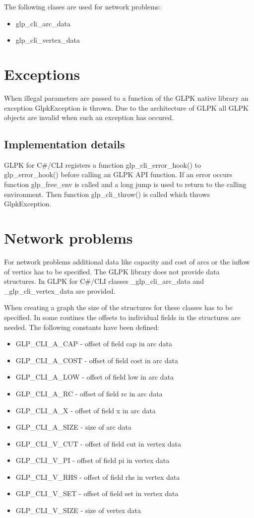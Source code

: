 \documentclass[a4paper,11pt]{report}
\begin{document}
The following clases are used for network problems:
\begin{itemize}
\item glp\_cli\_arc\_data
\item glp\_cli\_vertex\_data
\end{itemize}

\section{Exceptions}
When illegal parameters are passed to a function of the GLPK native library
an exception GlpkException is thrown. Due to the architecture of GLPK all
GLPK objects are invalid when such an exception has occured.

\subsection{Implementation details}
GLPK for C\#/CLI registers a function glp\_cli\_error\_hook() to glp\_error\_hook()
before calling an GLPK API function. If an error occurs function glp\_free\_env
is called and a long jump is used to return to the calling environment. Then
function glp\_cli\_throw() is called which throws GlpkException.

\section{Network problems}
For network problems additional data like capacity and cost of arcs or the
inflow of vertics has to be specified. The GLPK library does not provide
data structures. In GLPK for C\#/CLI classes \_glp\_cli\_arc\_data and
\_glp\_cli\_vertex\_data are provided.

When creating a graph the size of the structures for these classes has to be
specified. In some routines the offsets to individual fields in the structures are
needed. The following constants have been defined:

\begin{itemize}
\item GLP\_CLI\_A\_CAP  - offset of field cap in arc data
\item GLP\_CLI\_A\_COST - offset of field cost in arc data
\item GLP\_CLI\_A\_LOW  - offset of field low in arc data
\item GLP\_CLI\_A\_RC   - offset of field rc in arc data
\item GLP\_CLI\_A\_X    - offset of field x in arc data
\item GLP\_CLI\_A\_SIZE - size of arc data
\item GLP\_CLI\_V\_CUT  - offset of field cut in vertex data
\item GLP\_CLI\_V\_PI   - offset of field pi in vertex data
\item GLP\_CLI\_V\_RHS  - offset of field rhs in vertex data
\item GLP\_CLI\_V\_SET  - offset of field set in vertex data
\item GLP\_CLI\_V\_SIZE - size of vertex data
\end{itemize}
\end{document}
